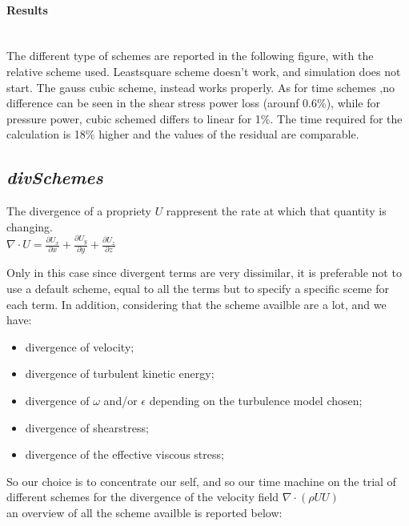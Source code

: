 \documentclass[a4paper,12pt]{article}
\begin{document}
\paragraph{Results} \mbox{}\\
The different type of schemes are reported in the following figure, with the relative scheme used. 
Leastsquare scheme doesn't work, and simulation does not start. The gauss cubic scheme, instead works properly.
As for time schemes ,no difference can be seen in the shear stress power loss (arounf 0.6\%), while for pressure power, cubic schemed differs to linear for 1\%. The time required for the calculation is 18\% higher and the values of the residual are comparable.




\subsection{\textit{divSchemes}}
The divergence of a propriety $U$ rappresent the rate at which that quantity is changing.
\\ $ \nabla \cdot U = \frac{\partial U_x}{\partial x}+ \frac{\partial U_y}{\partial y} + \frac{\partial U_z}{\partial z} $

Only in this case since divergent terms are very dissimilar, it is preferable not to use a default scheme, equal to all the terms but to specify a specific sceme for each term. In addition, considering that the scheme availble are a lot, and we have:
\begin{itemize} 
 \item divergence of velocity;
 \item divergence of turbulent kinetic energy;
 \item divergence of $\omega$ and/or $\epsilon$ depending on the turbulence model chosen;
 \item divergence of shearstress;
  \item divergence of the effective viscous stress; %
\end{itemize} 
So our choice is to concentrate our self, and so our time machine on the trial of different schemes for the divergence of the velocity field
 $ \nabla \cdot ( \rho UU )$
\\ an overview of all the scheme availble is reported below:
\end{document}
